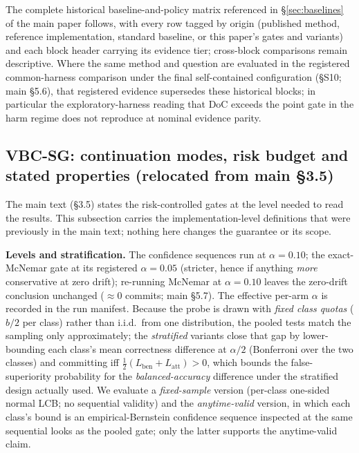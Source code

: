 \documentclass[a4paper,11pt]{article}
\makeatletter
\let\supp@subsection\subsection
\renewcommand{\subsection}{\FloatBarrier\supp@subsection}
\makeatother
\begin{document}









The complete historical baseline-and-policy matrix referenced in \S\ref{sec:baselines} of the main paper follows, with every row tagged by origin (published method, reference implementation, standard baseline, or this paper's gates and variants) and each block header carrying its evidence tier; cross-block comparisons remain descriptive. Where the same method and question are evaluated in the registered common-harness comparison under the final self-contained configuration (\S S10; main \S5.6), that registered evidence supersedes these historical blocks; in particular the exploratory-harness reading that DoC exceeds the point gate in the harm regime does not reproduce at nominal evidence parity.



\subsection{VBC-SG: continuation modes, risk budget and stated properties (relocated from main \S3.5)}
\label{sec:S2_vbcsg}

The main text (\S3.5) states the risk-controlled gates at the level needed to read the results.
This subsection carries the implementation-level definitions that were previously in the main
text; nothing here changes the guarantee or its scope.

\textbf{Levels and stratification.} The confidence sequences run at $\alpha=0.10$; the
exact-McNemar gate at its registered $\alpha=0.05$ (stricter, hence if anything \emph{more}
conservative at zero drift); re-running McNemar at $\alpha=0.10$ leaves the zero-drift conclusion
unchanged ($\approx 0$ commits; main \S5.7). The effective per-arm $\alpha$ is recorded in the run
manifest. Because the probe is drawn with \emph{fixed class quotas} ($b/2$ per class) rather than
i.i.d.\ from one distribution, the pooled tests match the sampling only approximately; the
\emph{stratified} variants close that gap by lower-bounding each class's mean correctness
difference at $\alpha/2$ (Bonferroni over the two classes) and committing iff
$\tfrac12(L_{\mathrm{ben}}+L_{\mathrm{att}})>0$, which bounds the false-superiority probability for
the \emph{balanced-accuracy} difference under the stratified design actually used. We evaluate a
\emph{fixed-sample} version (per-class one-sided normal LCB; no sequential validity) and the
\emph{anytime-valid} version, in which each class's bound is an empirical-Bernstein confidence
sequence inspected at the same sequential looks as the pooled gate; only the latter supports the
anytime-valid claim.
\end{document}
